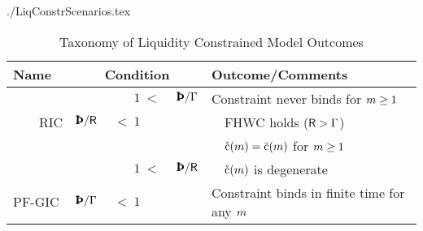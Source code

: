 \documentclass[titlepage,abstract]{bejournal}
\begin{document}
\begin{verbatimwrite}{./LiqConstrScenarios.tex}
\begin{table}[b]
\begin{center}
\caption{Taxonomy of Liquidity Constrained Model Outcomes}\label{table:LiqConstrScenarios}
\begin{tabular}{|l|rcl|l|}\hline
Name & \multicolumn{3}{c|}{Condition}             & Outcome/Comments %
\\ \hline
\cancel{PF-GIC}      & $\phantom{\Pat/\Rfree}$ & $\phantom{~<~}1        {~<~}$ & $        {\Pat/\PGro}$  & Constraint never binds for $m \geq 1$ %
\\ ~~~~RIC           & $        {\Pat/\Rfree}$ & $        {~<~}1\phantom{~<~}$ & $\phantom{\Pat/\PGro}$  & ~~FHWC holds ($\mathsf{R} > \Gamma$) %
\\ ~~~~              &                         &                               &                         & ~~$\mathring{\mathrm{c}}(m) = \bar{\mathrm{c}}(m)$ for $m \geq 1$ %
\\ ~~~~\cancel{RIC}   & $\phantom{\Pat/\Rfree}$ & $\phantom{~<~}1        {~<~}$ & $        {\Pat/\Rfree}$ & ~~$\mathring{\mathrm{c}}(m)$ is degenerate %
\\ PF-GIC             & $        {\Pat/\PGro}$ & $        {~<~}1\phantom{~<~}$ & $\phantom{\Pat/\Rfree}$  & Constraint binds in finite time for any $m$ %

\end{tabular}
\end{center}
\end{table}
\end{verbatimwrite}
\end{document}
